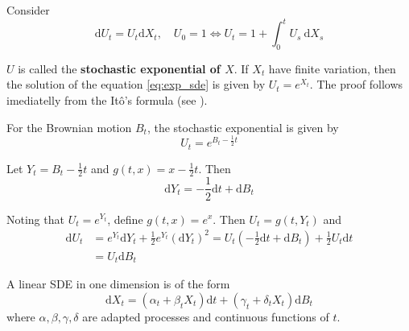 \begin{example}
    Consider
    \begin{equation}\label{eq:exp_sde}
        \mathrm{d}U_t = U_t \mathrm{d}X_t, \quad U_0 = 1 \iff U_t = 1 + \int_0^t U_s ~\mathrm{d}X_s
    \end{equation}

    $U$ is called the \textbf{stochastic exponential of $X$}. If $X_t$ have finite variation, then the solution of the equation \eqref{eq:exp_sde} is given by $U_t = e^{X_t}$. The proof follows imediatelly from the Itô's formula (see \cite{klebaner2012introduction}).

    For the Brownian motion $B_t$, the stochastic exponential is given by
    \begin{equation}
        U_t = e^{B_t - \frac{1}{2}t}
    \end{equation}

    Let $Y_t = B_t - \frac{1}{2}t$ and $g(t,x) = x - \frac{1}{2}t$. Then 
    \[
        \mathrm{d}Y_t = - \frac{1}{2} \mathrm{d}t + \mathrm{d}B_t
    \]

    Noting that $U_t = e^{Y_t}$, define $g(t, x) = e^x$. Then $U_t = g(t, Y_t)$ and 
    \begin{equation*}
        \begin{aligned}
            \mathrm{d}U_t &= e^{Y_t} \mathrm{d} Y_t + \frac{1}{2} e^{Y_t} (\mathrm{d} Y_t)^2
            = U_t \left( - \frac{1}{2} \mathrm{d}t + \mathrm{d}B_t \right) + \frac{1}{2} U_t \mathrm{d}t \\
            &= U_t \mathrm{d} B_t
        \end{aligned}
    \end{equation*}
\end{example}

A linear SDE in one dimension is of the form
\begin{equation}
    \mathrm{d}X_t = (\alpha_t + \beta_t X_t)\mathrm{d}t + (\gamma_t + \delta_t X_t)\mathrm{d}B_t
\end{equation}
where $\alpha, \beta, \gamma, \delta$ are adapted processes and continuous functions of $t$.

